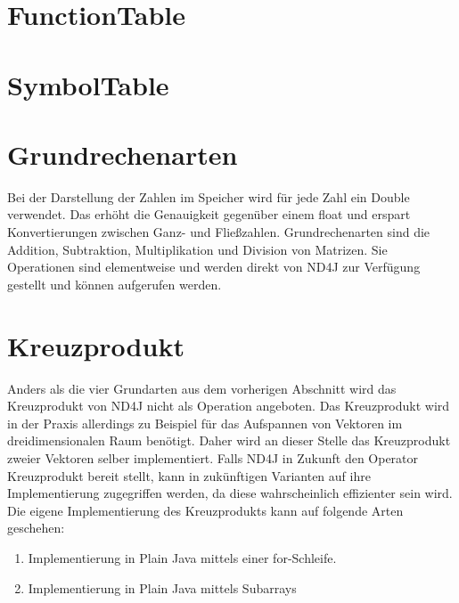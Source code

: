 \section{FunctionTable}

\section{SymbolTable}

\section{Grundrechenarten}
Bei der Darstellung der Zahlen im Speicher wird für jede Zahl ein Double verwendet.
Das erhöht die Genauigkeit gegenüber einem float und erspart Konvertierungen zwischen Ganz- und Fließzahlen.
Grundrechenarten sind die Addition, Subtraktion, Multiplikation und Division von Matrizen.
Sie Operationen sind elementweise und werden direkt von ND4J zur Verfügung gestellt und können aufgerufen werden.

\section{Kreuzprodukt}
Anders als die vier Grundarten aus dem vorherigen Abschnitt wird das Kreuzprodukt von ND4J nicht als Operation angeboten.
Das Kreuzprodukt wird in der Praxis allerdings zu Beispiel für das Aufspannen von Vektoren im dreidimensionalen Raum benötigt.
Daher wird an dieser Stelle das Kreuzprodukt zweier Vektoren selber implementiert.
Falls ND4J in Zukunft den Operator Kreuzprodukt bereit stellt, kann in zukünftigen Varianten auf ihre Implementierung zugegriffen werden, da diese wahrscheinlich effizienter sein wird.
Die eigene Implementierung des Kreuzprodukts kann auf folgende Arten geschehen:
\begin{enumerate}
	\item Implementierung in Plain Java mittels einer for-Schleife.
	\item Implementierung in Plain Java mittels Subarrays
\end{enumerate}

